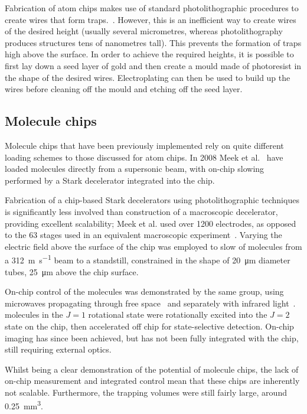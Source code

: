 %
Fabrication of atom chips makes use of standard photolithographic procedures to
create wires that form traps.~\cite{2011Ac}. However, this is an inefficient way
to create wires of the desired height (usually several micrometres, whereas
photolithography produces structures tens of nanometres tall). This prevents the
formation of traps high above the surface. In order to achieve the required
heights, it is possible to first lay down a seed layer of gold and then create a
mould made of photoresist in the shape of the desired wires. Electroplating can
then be used to build up the wires before cleaning off the mould and etching off
the seed layer.~\cite{4797887}

\subsection{Molecule chips}
\label{litrev:molculechips}


Molecule chips that have been previously implemented rely on quite different
loading schemes to those discussed for atom chips. In 2008 Meek et
al.~\cite{Meek2008} have loaded \CO{} molecules directly from a supersonic
beam, with on-chip slowing performed by a Stark decelerator integrated into the
chip.

Fabrication of a chip-based Stark decelerators using photolithographic
techniques is significantly less involved than construction of a macroscopic
decelerator, providing excellent scalability; Meek et al. used over 1200
electrodes, as opposed to the 63 stages used in an equivalent macroscopic
experiment~\cite{Bethlem1999}. Varying the electric field above the surface of
the chip was employed to slow of molecules from a \SI{312}{\metre\per\second}
beam to a standstill, constrained in the shape of \SI{20}{\micro\metre} diameter
tubes, \SI{25}{\micro\metre} above the chip surface.~\cite{Meek2009}

On-chip control of the molecules was demonstrated by the same group, using
microwaves propagating through free space~\cite{doi:10.1002/cphc.201001007} and
separately with infrared light~\cite{doi:10.1080/00268976.2012.683885}.  \CO{}
molecules in the $J=1$ rotational state were rotationally excited into the $J=2$
state on the chip, then accelerated off chip for state-selective detection.
On-chip imaging has since been achieved, but has not been fully integrated with
the chip, still requiring external optics.~\cite{Marx2013}

Whilst being a clear demonstration of the potential of
molecule chips, the lack of on-chip measurement and integrated control mean that
these chips are inherently not scalable.  Furthermore, the trapping volumes were
still fairly large, around \SI{0.25}{\milli\metre\cubed}. 
%

